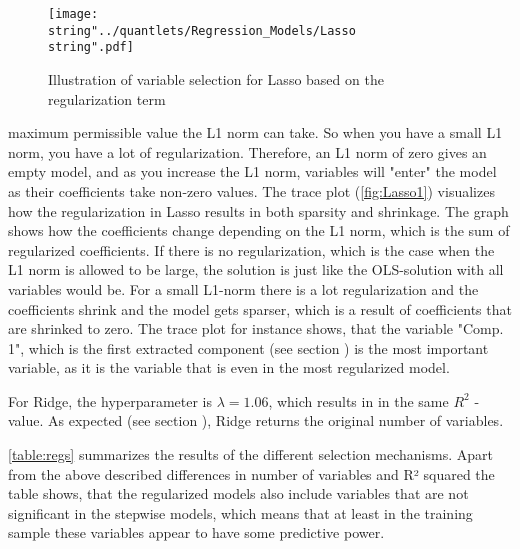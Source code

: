 \begin{figure}[H]
  \centering
\texttt{[image: \\string"../quantlets/Regression\_Models/Lasso\\string".pdf]}
  \caption{Illustration of variable selection for Lasso based on the regularization term}\label{fig:Lasso1}
\end{figure}
 maximum permissible value the L1 norm can take. So when you have a small L1 norm, you have a lot of regularization. Therefore, an L1 norm of zero gives an empty model, and as you increase the L1 norm, variables will "enter" the model as their coefficients take non-zero values. 
The trace plot (\autoref{fig:Lasso1}) visualizes how the regularization in Lasso results in both sparsity and shrinkage. The graph shows how the coefficients change depending on the L1 norm, which is the sum of regularized coefficients. If there is no regularization, which is the case when the L1 norm is allowed to be large,  the solution is just like the OLS-solution with all variables would be. For a small L1-norm there is a lot regularization and the coefficients shrink and the model gets sparser, which is a result of coefficients that are shrinked to zero. The trace plot for instance shows, that the variable  "Comp. 1", which is the first extracted component (see section ) is the most important variable, as it is the variable that is even in the most regularized model.  

For Ridge, the hyperparameter is $\lambda = 1.06$, which results in in the same $R^{2}$ -value. As expected (see section ), Ridge returns the original number of variables. 

\autoref{table:regs} summarizes the results of the different selection mechanisms. Apart from the above described differences in number of variables and R² squared the table shows, that the regularized models also include variables that are not significant in the stepwise models, which means that at least in the training sample these variables appear to have some predictive power. 

 
\label{table:regs}
 
\FloatBarrier